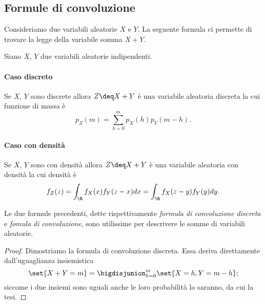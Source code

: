 \subsection{Formule di convoluzione}

Consideriamo due variabili aleatorie $X$ e $Y$. La seguente formula ci permette di trovare la legge della variabile somma $X + Y$.

\begin{proposition}
     Siano $X$, $Y$ due variabili aleatorie indipendenti. 
    \paragraph{Caso discreto} Se $X$, $Y$ sono discrete allora $Z \deq X + Y$ è una variabile aleatoria discreta la cui funzione di massa è \[
        p_Z(m) = \sum_{h = 0}^m p_X(h)p_Y(m-h).    
    \]
    \paragraph{Caso con densità} Se $X$, $Y$ sono con densità allora $Z \deq X + Y$ è una variabile aleatoria con densità la cui densità è \[
        f_Z(z) = \int_\R f_X(x)f_Y(z-x)dx = \int_\R f_X(z-y)f_Y(y)dy.
    \]
\end{proposition}

Le due formule precedenti, dette rispettivamente \emph{formula di convoluzione discreta} e \emph{fomula di convoluzione}, sono utilissime per descrivere le somme di variabili aleatorie.

\begin{proof}
    Dimostriamo la formula di convoluzione discreta. Essa deriva direttamente dall'uguaglianza insiemistica \[
        \set{X+Y = m} = \bigdisjunion_{h = 0}^m \set{X = h, Y = m-h};    
    \] siccome i due insiemi sono uguali anche le loro probabilità lo saranno, da cui la tesi.
\end{proof}